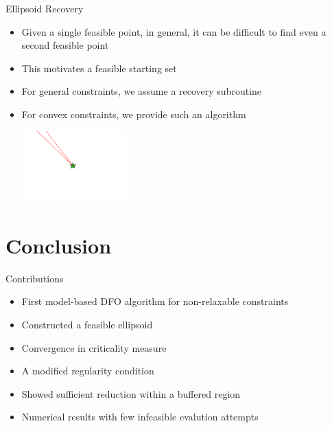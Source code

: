 \documentclass{beamer}
\begin{document}
\begin{frame}{Ellipsoid Recovery}
\begin{itemize}
	\item Given a single feasible point, in general, it can be difficult to find even a second feasible point
	\item This motivates a feasible starting set
	\item For general constraints, we assume a recovery subroutine
	\item For convex constraints, we provide such an algorithm
	\begin{center}
		\includegraphics[width=150px]{images/only_one_feasible_point.png}
	\end{center}
\end{itemize}
\end{frame}




\section{Conclusion}

\begin{frame}{Contributions}
	\begin{itemize}
		\setlength\itemsep{1.5em}
		\item First model-based DFO algorithm for non-relaxable constraints
		\item Constructed a feasible ellipsoid
		\item Convergence in criticality measure
		\item A modified regularity condition
		\item Showed sufficient reduction within a buffered region
		\item Numerical results with few infeasible evalution attempts
	\end{itemize}
\end{frame}
\end{document}

